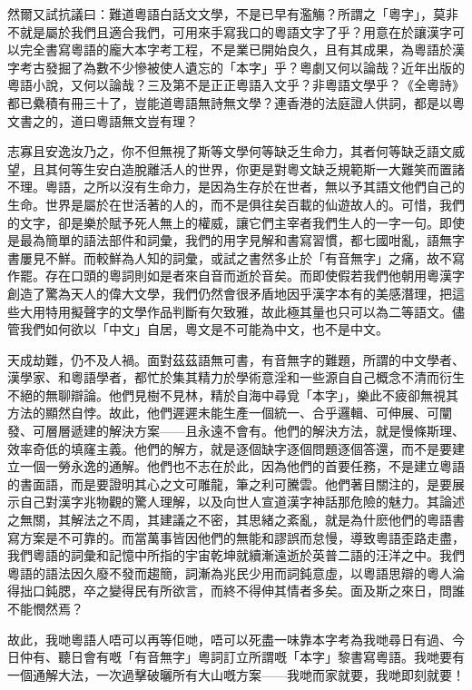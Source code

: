 \documentclass[a5paper, 10pt, openany]{book} %
\begin{document}
  然爾又試抗議曰：難道粵語白話文文學，不是已早有濫觴？所謂之「粵字」，莫非不就是屬於我們且適合我們，可用來手寫我口的粵語文字了乎？用意在於讓漢字可以完全書寫粵語的龐大本字考工程，不是業已開始良久，且有其成果，為粵語於漢字考古發掘了為數不少慘被使人遺忘的「本字」乎？粵劇又何以論哉？近年出版的粵語小說，又何以論哉？三及第不是正正粵語入文乎？非粵語文學乎？《全粵詩》都已纍積有冊三十了，豈能道粵語無詩無文學？連香港的法庭證人供詞，都是以粵文書之的，道曰粵語無文豈有理？

  志寡且安逸汝乃之，你不但無視了斯等文學何等缺乏生命力，其者何等缺乏語文威望，且其何等生安白造脫離活人的世界，你更是對粵文缺乏規範斯一大難笑而置諸不理。粵語，之所以沒有生命力，是因為生存於在世者，無以予其語文他們自己的生命。世界是屬於在世活著的人的，而不是俱往矣百載的仙遊故人的。可惜，我們的文字，卻是樂於賦予死人無上的權威，讓它們主宰者我們生人的一字一句。即使是最為簡單的語法部件和詞彙，我們的用字見解和書寫習慣，都七國咁亂，語無字書屢見不鮮。而較鮮為人知的詞彙，或試之書然多止於「有音無字」之痛，故不寫作罷。存在口頭的粵詞則如是者來自音而逝於音矣。而即使假若我們他朝用粵漢字創造了驚為天人的偉大文學，我們仍然會很矛盾地因乎漢字本有的美感潛理，把這些大用特用擬聲字的文學作品判斷有欠致雅，故此極其量也只可以為二等語文。儘管我們如何欲以「中文」自居，粵文是不可能為中文，也不是中文。

  天成劫難，仍不及人禍。面對茲茲語無可書，有音無字的難題，所謂的中文學者、漢學家、和粵語學者，都忙於集其精力於學術意淫和一些源自自己概念不清而衍生不絕的無聊辯論。他們見樹不見林，精於自海中尋覓「本字」，樂此不疲卻無視其方法的顯然自悖。故此，他們遲遲未能生產一個統一、合乎邏輯、可伸展、可闡發、可層層遞建的解決方案——且永遠不會有。他們的解決方法，就是慢條斯理、效率奇低的填窿主義。他們的解方，就是逐個缺字逐個問題逐個答還，而不是要建立一個一勞永逸的通解。他們也不志在於此，因為他們的首要任務，不是建立粵語的書面語，而是要證明其心之文可雕龍，筆之利可騰雲。他們著目關注的，是要展示自己對漢字兆物觀的驚人理解，以及向世人宣道漢字神話那危險的魅力。其論述之無關，其解法之不周，其建議之不密，其思緒之紊亂，就是為什麽他們的粵語書寫方案是不可靠的。而當萬事皆因他們的無能和謬誤而怠慢，導致粵語歪路走盡，我們粵語的詞彙和記憶中所指的宇宙乾坤就續漸遠逝於英普二語的汪洋之中。我們粵語的語法因久廢不發而趨簡，詞漸為兆民少用而詞鈍意虛，以粵語思辯的粵人淪得拙口鈍腮，卒之變得民有所欲言，而終不得伸其情者多矣。面及斯之來日，問誰不能憫然焉？

  故此，我哋粵語人唔可以再等佢哋，唔可以死盡一味靠本字考為我哋尋日有過、今日仲有、聽日會有嘅「有音無字」粵詞訂立所謂嘅「本字」黎書寫粵語。我哋要有一個通解大法，一次過擊破曬所有大山嘅方案——我哋而家就要，我哋即刻就要！
\end{document}
